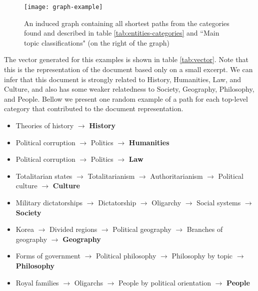  
\begin{figure}[H]
  \texttt{[image: graph-example]}
  \caption{An induced graph containing all shortest paths from the categories found and described in table \ref{tab:entities-categories} and ``Main topic classifications" (on the right of the graph)}
  \label{fig:graph-example}
\end{figure}


The vector generated for this examples is shown in table \ref{tab:vector}. Note that this is the representation of the document based only on a small excerpt. 
We can infer that this document is strongly related to History, Humanities, Law, and Culture, and also has some weaker relatedness to Society, Geography, Philosophy, and People. Bellow we present one random example of a path for each top-level category that contributed to the document representation.


\begin{itemize}

\item Theories of history $\rightarrow$ \textbf{History} 

\item Political corruption $\rightarrow$ Politics $\rightarrow$ \textbf{Humanities}

\item Political corruption $\rightarrow$ Politics $\rightarrow$ \textbf{Law} 


\item Totalitarian states $\rightarrow$ Totalitarianism $\rightarrow$ Authoritarianism $\rightarrow$ Political culture $\rightarrow$ \textbf{Culture}


\item Military dictatorships $\rightarrow$ Dictatorship $\rightarrow$ Oligarchy $\rightarrow$ Social systems $\rightarrow$ \textbf{Society} 


\item 
Korea $\rightarrow$ Divided regions $\rightarrow$ Political geography $\rightarrow$ Branches of geography $\rightarrow$ \textbf{Geography}


\item Forms of government $\rightarrow$ Political philosophy $\rightarrow$ Philosophy by topic $\rightarrow$ \textbf{Philosophy}

\item Royal families $\rightarrow$ Oligarchs $\rightarrow$ People by political orientation $\rightarrow$ \textbf{People} 


\end{itemize}


